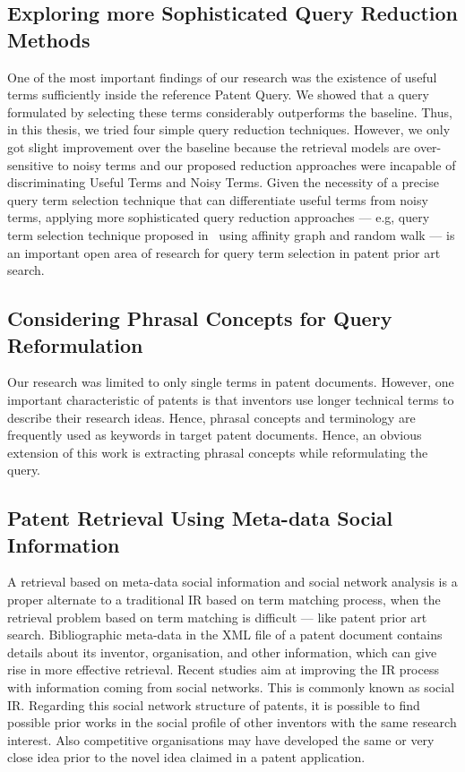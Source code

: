 \subsection{Exploring more Sophisticated Query Reduction Methods}
\label{subsec:SophisticatedQueryReduction}
One of the most important findings of our research was the existence of useful terms sufficiently inside the reference Patent Query. 
We showed that a query formulated by selecting these terms considerably outperforms the baseline. 
Thus, in this thesis, we tried four simple query reduction techniques. However, we only got slight improvement over the baseline because the retrieval models are over-sensitive to noisy terms and our proposed reduction approaches were incapable of discriminating Useful Terms and Noisy Terms. 
Given the necessity of a precise query term selection technique that can differentiate useful terms from noisy terms, 
applying more sophisticated query reduction approaches --- e.g, query term selection technique proposed in~\citep{maxwell2013compact} using affinity graph and random walk --- is an important open area of research for query term selection in patent prior art search.     

\subsection{Considering Phrasal Concepts for Query Reformulation }
\label{subsec: PhraseAnalysis}
Our research was limited to only single terms in patent documents. 
However, one important characteristic of patents is that 
inventors use longer technical terms to describe their research ideas. 
Hence, phrasal concepts and terminology 
are frequently used as keywords in target patent documents.
Hence, an obvious extension of this work is extracting phrasal concepts while reformulating the query. 

\subsection{Patent Retrieval Using Meta-data Social Information}
\label{subsec: Meta-dataNetworkAnalysis}
A retrieval based on meta-data social information and social network analysis 
is a proper alternate to a traditional IR based on term matching process, 
when the retrieval problem based on term matching is difficult --- like patent prior art search.  
Bibliographic meta-data in the XML file of a patent document contains details about 
its inventor, organisation, and other information, which can give rise in more effective retrieval. 
Recent studies aim at improving the IR process with
information coming from social networks. This is commonly known as social IR. 
Regarding this social network structure of patents, it is possible to 
find possible prior works in the social profile of other inventors with the same research interest.
Also competitive organisations may have developed the same or very close idea prior to the novel 
idea claimed in a patent application.


